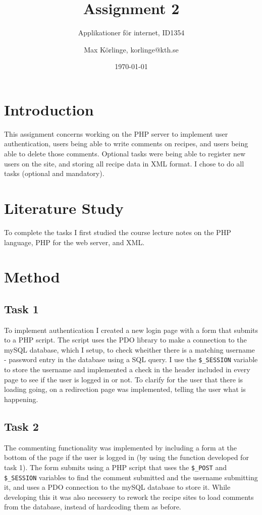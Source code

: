 \documentclass[a4paper]{scrreprt}
\title{Assignment 2}
\subtitle{Applikationer för internet, ID1354}
\author{Max Körlinge, korlinge@kth.se}
\date{\today}
\newcommand{\code}[1]{\texttt{#1}}
\begin{document}
\maketitle

\tableofcontents %
\clearpage

\chapter{Introduction}

This assignment concerns working on the PHP server to implement user authentication, users being able to write comments on recipes, and users being able to delete those comments. Optional tasks were being able to register new users on the site, and storing all recipe data in XML format. I chose to do all tasks (optional and mandatory).

\chapter{Literature Study}

To complete the tasks I first studied the course lecture notes on the PHP language, PHP for the web server, and XML.

\chapter{Method}

\section{Task 1}

To implement authentication I created a new login page with a form that submits to a PHP script. The script uses the PDO library to make a connection to the mySQL database, which I setup, to check wheither there is a matching username - password entry in the database using a SQL query. I use the \code{\$\_SESSION} variable to store the username and implemented a check in the header included in every page to see if the user is logged in or not. To clarify for the user that there is loading going, on a redirection page was implemented, telling the user what is happening.

\section{Task 2}

The commenting functionality was implemented by including a form at the bottom of the page if the user is logged in (by using the function developed for task 1). The form submits using a PHP script that uses the \code{\$\_POST} and \code{\$\_SESSION} variables to find the comment submitted and the username submitting it, and uses a PDO connection to the mySQL database to store it. While developing this it was also necessery to rework the recipe sites to load comments from the database, instead of hardcoding them as before.
\end{document}
